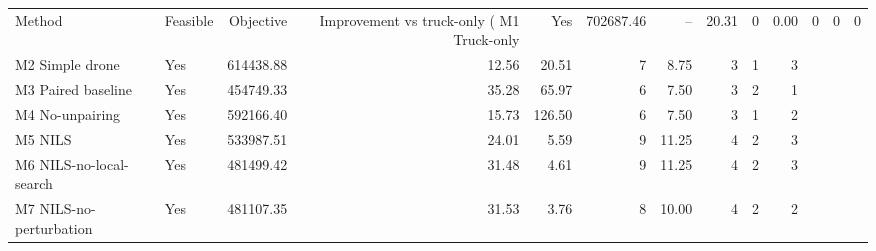 \begin{tabular}{llrrrrrrrr}
\toprule
Method & Feasible & Objective & Improvement vs truck-only (%
\midrule
M1 Truck-only & Yes & 702687.46 & -- & 20.31 & 0 & 0.00 & 0 & 0 & 0 \\
M2 Simple drone & Yes & 614438.88 & 12.56 & 20.51 & 7 & 8.75 & 3 & 1 & 3 \\
M3 Paired baseline & Yes & 454749.33 & 35.28 & 65.97 & 6 & 7.50 & 3 & 2 & 1 \\
M4 No-unpairing & Yes & 592166.40 & 15.73 & 126.50 & 6 & 7.50 & 3 & 1 & 2 \\
M5 NILS & Yes & 533987.51 & 24.01 & 5.59 & 9 & 11.25 & 4 & 2 & 3 \\
M6 NILS-no-local-search & Yes & 481499.42 & 31.48 & 4.61 & 9 & 11.25 & 4 & 2 & 3 \\
M7 NILS-no-perturbation & Yes & 481107.35 & 31.53 & 3.76 & 8 & 10.00 & 4 & 2 & 2 \\
\bottomrule
\end{tabular}
